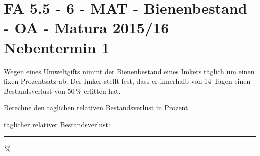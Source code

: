 \section{FA 5.5 - 6 - MAT - Bienenbestand - OA - Matura 2015/16 Nebentermin 1}

\begin{beispiel}[FA 5.5]{1} %
Wegen eines Umweltgifts nimmt der Bienenbestand eines Imkers täglich um einen fixen Prozentsatz
ab. Der Imker stellt fest, dass er innerhalb von 14 Tagen einen Bestandsverlust von 50\,\%
erlitten hat.\leer

Berechne den täglichen relativen Bestandsverlust in Prozent. \leer

täglicher relativer Bestandsverlust:\rule{4cm}{0.3pt}\,\%

\end{beispiel}